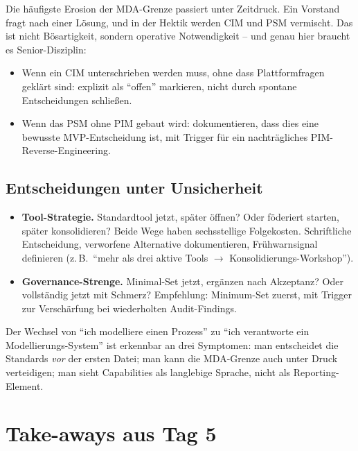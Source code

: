\documentclass[11pt,a4paper,oneside]{article}
\begin{document}
Die häufigste Erosion der MDA-Grenze passiert unter Zeitdruck. Ein Vorstand fragt nach einer Lösung, und in der Hektik werden CIM und PSM vermischt. Das ist nicht Bösartigkeit, sondern operative Notwendigkeit -- und genau hier braucht es Senior-Disziplin:

\begin{itemize}
  \item Wenn ein CIM unterschrieben werden muss, ohne dass Plattformfragen geklärt sind: explizit als ``offen'' markieren, nicht durch spontane Entscheidungen schließen.
  \item Wenn das PSM ohne PIM gebaut wird: dokumentieren, dass dies eine bewusste MVP-Entscheidung ist, mit Trigger für ein nachträgliches PIM-Reverse-Engineering.
\end{itemize}

\subsection{Entscheidungen unter Unsicherheit}

\begin{itemize}
  \item \textbf{Tool-Strategie.} Standardtool jetzt, später öffnen? Oder föderiert starten, später konsolidieren? Beide Wege haben sechsstellige Folgekosten. Schriftliche Entscheidung, verworfene Alternative dokumentieren, Frühwarnsignal definieren (z.\,B.\ ``mehr als drei aktive Tools $\rightarrow$ Konsolidierungs-Workshop'').
  \item \textbf{Governance-Strenge.} Minimal-Set jetzt, ergänzen nach Akzeptanz? Oder vollständig jetzt mit Schmerz? Empfehlung: Minimum-Set zuerst, mit Trigger zur Verschärfung bei wiederholten Audit-Findings.
\end{itemize}

\begin{merkbox}
Der Wechsel von ``ich modelliere einen Prozess'' zu ``ich verantworte ein Modellierungs-System'' ist erkennbar an drei Symptomen: man entscheidet die Standards \emph{vor} der ersten Datei; man kann die MDA-Grenze auch unter Druck verteidigen; man sieht Capabilities als langlebige Sprache, nicht als Reporting-Element.
\end{merkbox}

\section{Take-aways aus Tag 5}
\end{document}
